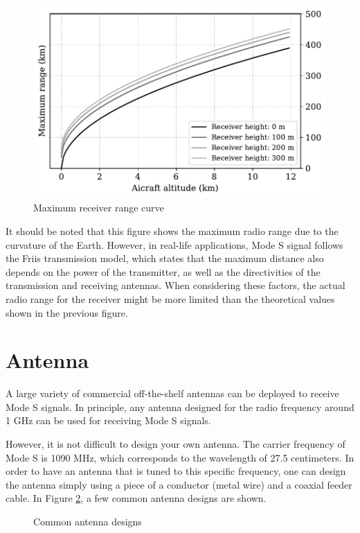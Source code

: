 \begin{figure}[ht]
  \centering
  \includegraphics[scale=0.6]{figures/quickstart/max_range_curve.pdf}
  \caption{Maximum receiver range curve}
  \label{fig:max_range_curve}
\end{figure}


It should be noted that this figure shows the maximum radio range due to the curvature of the Earth. However, in real-life applications, Mode S signal follows the Friis transmission model, which states that the maximum distance also depends on the power of the transmitter, as well as the directivities of the transmission and receiving antennas. When considering these factors, the actual radio range for the receiver might be more limited than the theoretical values shown in the previous figure.

\section{Antenna}
A large variety of commercial off-the-shelf antennas can be deployed to receive Mode S signals. In principle, any antenna designed for the radio frequency around 1 GHz can be used for receiving Mode S signals.

However, it is not difficult to design your own antenna. The carrier frequency of Mode S is 1090 MHz, which corresponds to the wavelength of 27.5 centimeters. In order to have an antenna that is tuned to this specific frequency, one can design the antenna simply using a piece of a conductor (metal wire) and a coaxial feeder cable. In Figure \ref{fig:antennas}, a few common antenna designs are shown.

\begin{figure}[ht]
  \centering
  
  \caption{Common antenna designs}
  \label{fig:antennas}
\end{figure}

